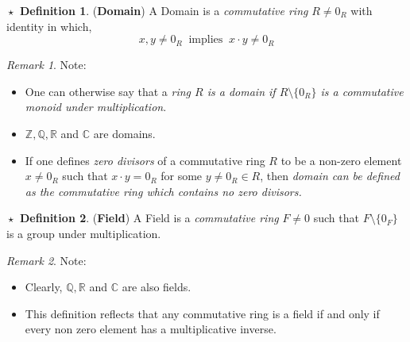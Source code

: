 \documentclass{article}
\theoremstyle{definition}
\newtheorem{definition}{$\boxed{\star}$ Definition}
\theoremstyle{remark}
\newtheorem*{remark}{Remark}
\theoremstyle{definition}
\theoremstyle{definition}
\theoremstyle{definition}
\theoremstyle{proof}
\begin{document}
\hrulefill
\begin{definition}
	(\textbf{Domain}) A Domain is a \emph{commutative ring} $ R\neq 0_R $ with identity  in which,
	\[x,y\neq 0_R \;\;\text{implies}\;\; x\cdot y\neq  0_R\]
\end{definition}
\begin{remark}
	Note:
	\begin{itemize}
		\item {One can otherwise say that a \emph{ring $ R $ is a domain if $ R\setminus \{0_R\} $ is a commutative monoid under multiplication}.}
		\item {$ \mathbb{Z},\mathbb{Q},\mathbb{R} $ and $ \mathbb{C} $ are domains.}
		\item {If one defines \emph{zero divisors} of a commutative ring $ R $ to be a non-zero element $ x\neq 0_R $ such that $ x\cdot y = 0_R $ for some $ y \neq 0_R \in R $, then \emph{domain can be defined as the commutative ring which contains no zero divisors.}}
	\end{itemize}
\end{remark}
\hrulefill
\begin{definition}
	(\textbf{Field}) A Field is a \emph{commutative ring} $ F\neq 0 $ such that $ F\setminus\{0_F\} $ is a group under multiplication.
\end{definition}
\begin{remark}
	Note:
\begin{itemize}
	\item {	Clearly, $ \mathbb{Q},\mathbb{R} $ and $ \mathbb{C}$ are also fields.}
	\item {This definition reflects that any commutative ring is a field if and only if every non zero element has a multiplicative inverse.}
\end{itemize}
\end{remark}
\hrulefill

\end{document}
